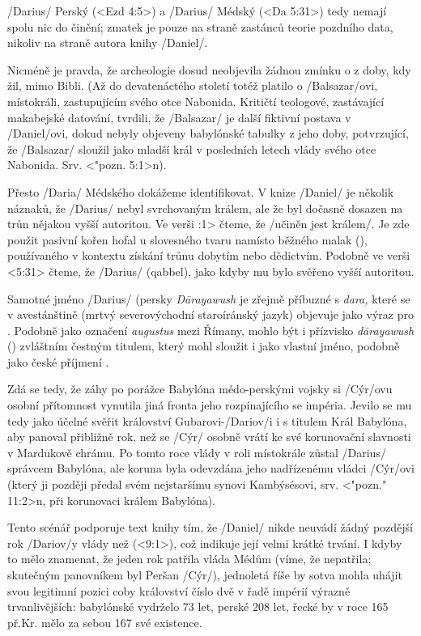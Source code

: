 \enditems

\x/Darius/ Perský (<Ezd 4:5>) a \x/Darius/ Médský (<Da 5:31>) tedy nemají spolu nic do činění; zmatek je pouze na straně zastánců teorie pozdního data, nikoliv na straně autora knihy \x/Daniel/.

Nicméně je pravda, že archeologie dosud neobjevila žádnou zmínku o  z doby, kdy žil, mimo Bibli.
(Až do devatenáctého století totéž platilo o \x/Balsazar/ovi, místokráli, zastupujícím svého otce Nabonida. Kritičtí teologové, zastávající makabejské datování, tvrdili, že
\x/Balsazar/ je další fiktivní postava v \x/Daniel/ovi, dokud nebyly objeveny babylónské tabulky z jeho doby,  potvrzující, že \x/Balsazar/ sloužil jako mladší král v posledních letech vlády svého otce Nabonida. Srv. <"pozn. 5:1>n).

Přesto \x/Daria/ Médského dokážeme identifikovat.
V knize \x/Daniel/ je několik náznaků, že \x/Darius/ nebyl svrchovaným králem, ale že byl dočasně dosazen na trůn nějakou vyšší autoritou.
Ve verši :1> čteme, že \x/učiněn jest králem/. Je zde použit pasivní kořen hofal u slovesného tvaru  namísto běžného malak (), používaného v kontextu získání trůnu dobytím nebo dědictvím.
Podobně ve verši <5:31> čteme, že \x/Darius/  (qabbel), jako kdyby mu bylo svěřeno vyšší autoritou.

Samotné jméno \x/Darius/ (persky {\it D\oldaccents\=arayawush\/} je zřejmě příbuzné s {\it dara,\/} které se v avestánštině (mrtvý severovýchodní staroíránský jazyk) objevuje jako
výraz pro . Podobně jako označení {\it augustus\/} mezi Římany, mohlo být i přízvisko {\it d\oldaccents\=arayawush\/} () zvláštním čestným titulem, který
mohl sloužit i jako vlastní jméno, podobně jako české příjmení .

Zdá se tedy, že záhy po porážce Babylóna médo-perskými vojsky si \x/Cýr/ovu osobní přítomnost vynutila jiná fronta jeho rozpínajícího se impéria. Jevilo se mu tedy jako účelné
svěřit království Gubarovi-\x/Dariov/i i s titulem Král Babylóna, aby panoval přibližně rok, než se \x/Cýr/ osobně vrátí ke své korunovační slavnosti v Mardukově chrámu.
Po tomto roce vlády v roli místokrále zůstal \x/Darius/ správcem Babylóna, ale koruna byla odevzdána jeho nadřízenému vládci \x/Cýr/ovi (který ji později předal svém nejstaršímu synovi Kambýsésovi, srv. <"pozn." 11:2>n, při korunovaci králem Babylóna).

Tento scénář podporuje text knihy tím, že \x/Daniel/ nikde neuvádí žádný pozdější rok \x/Dariov/y vlády než  (<9:1>), což indikuje její velmi krátké trvání.
I kdyby to mělo znamenat, že jeden rok patřila vláda Médům (víme, že nepatřila; skutečným panovníkem byl Peršan \x/Cýr/), jednoletá říše by sotva mohla uhájit svou legitimní
pozici coby království číslo dvě v řadě impérií výrazně trvanlivějších: babylónské vydrželo 73 let, perské 208 let, řecké by v roce 165 př.Kr. mělo za sebou 167 své existence. 

